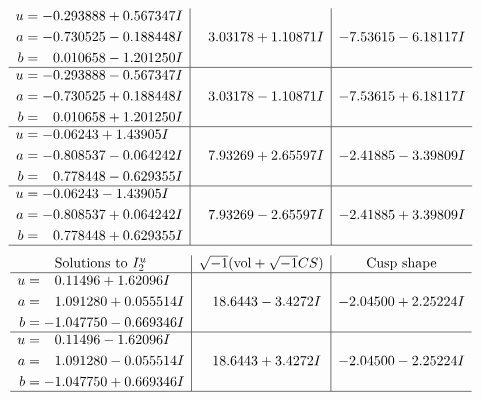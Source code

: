 \documentclass[1p]{elsarticle_modified}
\theoremstyle{definition}
\newcommand{\I}{\sqrt{-1}}
\begin{document}
$$\begin{array}{c|c|c}
\begin{aligned}
u &= -0.293888 + 0.567347 I \\
a &= -0.730525 - 0.188448 I \\
b &= \phantom{-}0.010658 - 1.201250 I\end{aligned}
 & \phantom{-}3.03178 + 1.10871 I & -7.53615 - 6.18117 I \\ \hline\begin{aligned}
u &= -0.293888 - 0.567347 I \\
a &= -0.730525 + 0.188448 I \\
b &= \phantom{-}0.010658 + 1.201250 I\end{aligned}
 & \phantom{-}3.03178 - 1.10871 I & -7.53615 + 6.18117 I \\ \hline\begin{aligned}
u &= -0.06243 + 1.43905 I \\
a &= -0.808537 - 0.064242 I \\
b &= \phantom{-}0.778448 - 0.629355 I\end{aligned}
 & \phantom{-}7.93269 + 2.65597 I & -2.41885 - 3.39809 I \\ \hline\begin{aligned}
u &= -0.06243 - 1.43905 I \\
a &= -0.808537 + 0.064242 I \\
b &= \phantom{-}0.778448 + 0.629355 I\end{aligned}
 & \phantom{-}7.93269 - 2.65597 I & -2.41885 + 3.39809 I\\
 \hline 
 \end{array}$$\newpage$$\begin{array}{c|c|c}  
\text{Solutions to }I^u_{2}& \I (\text{vol} + \sqrt{-1}CS) & \text{Cusp shape}\\
 \hline 
\begin{aligned}
u &= \phantom{-}0.11496 + 1.62096 I \\
a &= \phantom{-}1.091280 + 0.055514 I \\
b &= -1.047750 - 0.669346 I\end{aligned}
 & \phantom{-}18.6443 - 3.4272 I & -2.04500 + 2.25224 I \\ \hline\begin{aligned}
u &= \phantom{-}0.11496 - 1.62096 I \\
a &= \phantom{-}1.091280 - 0.055514 I \\
b &= -1.047750 + 0.669346 I\end{aligned}
 & \phantom{-}18.6443 + 3.4272 I & -2.04500 - 2.25224 I\\
 \hline 
 \end{array}$$\newpage\newpage\renewcommand{\arraystretch}{1}
\end{document}
